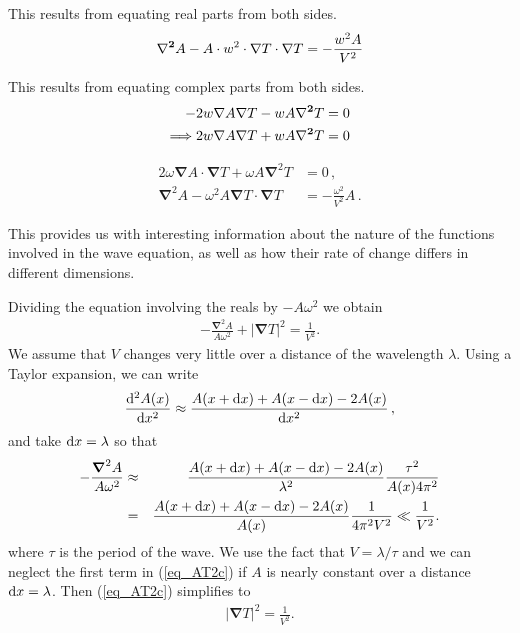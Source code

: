 \documentclass{mm2}
\newcommand{\bnabla}{\boldsymbol{\nabla}}
\begin{document}
\begin{answer}{2}
This results from equating real parts from both sides.
\begin{eqnarray}
{\bf \nabla^2} A - A \cdot w^2 \cdot {\bf \nabla} T  \cdot {\bf \nabla}T=  -\frac{w^2A}{V^2}
\end{eqnarray}

This results from equating complex parts from both sides.
\begin{eqnarray}
-2w{\bf \nabla} A {\bf \nabla} T - w A {\bf \nabla^2} T =0\\
\Longrightarrow 2w{\bf \nabla} A {\bf \nabla} T + w A {\bf \nabla^2} T =0
\end{eqnarray}

\begin{align}
2\omega \bnabla A \cdot \bnabla T+\omega A \bnabla^2T &=0\,,
\label{eq_AT2a}
\\[1ex]
\bnabla^2A-\omega^2A \bnabla T\cdot\bnabla T
&=-\frac{\omega^2}{V^2}A\,.
\label{eq_AT2b}
\end{align}

This provides us with interesting information about the nature of the functions involved in the wave equation, as well as how their rate of change differs in different dimensions.

Dividing the equation involving the reals by $-A\omega^2$ we obtain
\begin{eqnarray}
-\frac{\bnabla^2A}{A\omega^2}+|\bnabla T|^2
=\frac{1}{V^2}.
\label{eq_AT2c}
\end{eqnarray}
We assume that $V$ changes
very little over a distance of the wavelength $\lambda$. 
Using a Taylor expansion, we can write
\begin{eqnarray}
\frac{{\rm d}^2A(x)}{{\rm d}x^2}\approx \frac{A(x+{\rm d}x)+A(x-{\rm d}x)-2A(x)}{{\rm d}x^2}\,,
\end{eqnarray}
and take ${\rm d}x=\lambda$ so that
\begin{eqnarray}
-\frac{\bnabla^2A}{A\omega^2}&\approx& 
\frac{A(x+{\rm d}x)+A(x-{\rm d}x)-2A(x)}{\lambda^2}\frac{\tau^2}{A(x) 4\pi^2}\nonumber\\
&=&\frac{A(x+{\rm d}x)+A(x-{\rm d}x)-2A(x)}{A(x)}\frac{1}{4\pi^2V^2}\ll\frac{1}{V^2}.
\end{eqnarray}
where $\tau$ is the period of the wave. We use the fact that 
$V=\lambda/\tau$ and we can neglect the first term in (\ref{eq_AT2c})
if $A$ is nearly constant over a distance ${\rm d}x=\lambda$. Then (\ref{eq_AT2c})
simplifies to
\begin{eqnarray}
|\bnabla T|^2
=\frac{1}{V^2}.
\label{eq_eikonala}
\end{eqnarray}


\end{answer}
\end{document}
